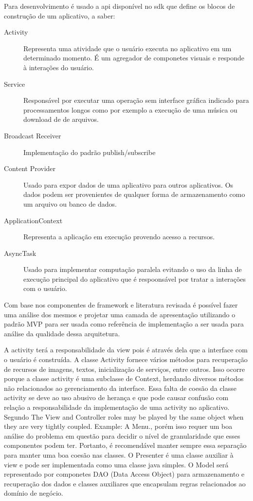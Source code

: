 Para desenvolvimento é usado a api disponível no sdk que define
os blocos de construção de um aplicativo, a saber:

\begin{description}
  \item[Activity] Representa uma atividade que o usuário executa no aplicativo
  em um determinado momento. É um agregador de componetes visuais e responde à
  interações do usuário.
  \item[Service] Responsável por executar uma operação sem interface gráfica
  indicado para processamentos longos como por exemplo a execução de uma música
  ou download de de arquivos.
  \item[Broadcast Receiver] Implementação do padrão publish/subscribe 
  \item[Content Provider] Usado para expor dados de uma aplicativo para outros
  aplicativos. Os dados podem ser provenientes de qualquer forma de
  armazenamento como um arquivo ou banco de dados.
  \item[ApplicationContext] Representa a aplicação em execução provendo acesso
  a recursos.
  \item[AsyncTask] Usado para implementar computação paralela evitando o uso da
  linha de execução principal do aplicativo que é respoonsável por tratar a
  interações com o usuário.
\end{description}


Com base nos componentes de framework e literatura revisada é possível fazer
uma análise dos mesmos e projetar uma camada de apresentação utilizando o padrão
MVP para ser usada como referência de implementação a ser usada para análise da
qualidade dessa arquitetura.

A activity terá a responsabilidade da view pois é através dela que a interface
com o usuário é construída. A classe Activity fornece vários métodos para
recuperação de recursos de imagens, textos, inicialização de serviços, entre
outros. Isso ocorre porque a classe activity é uma subclasse de Context,
herdando diversos métodos não relacionados ao gerenciamento da interface. Essa
falta de coesão da classe activity se deve ao uso abusivo de herança e que pode
causar confusão com relação a responsabilidade da implementação de uma activity no
aplicativo. Segundo  The View and Controller roles
may be played by the same object when they are very tightly coupled. Example: A
Menu., porém isso requer um boa análise do problema em questão para decidir o
nível de granularidade que esses componentes podem ter. Portanto, é recomendável
manter sempre essa separação para manter uma boa coesão nas classes. O Presenter
é uma classe auxiliar à view e pode ser implementada como uma classe java
simples. O Model será representado por componetes DAO (Data Access Object) para
armazenamento e recuperação dos dados e classes auxiliares que encapsulam
regras relacionados ao domínio de negócio.
